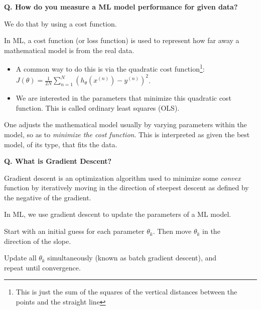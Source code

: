 \begin{frame}[fragile]{\textbf{Q. How do you measure a ML model performance for given data?}}
  \begin{wideitemize}
    \item We do that by using a cost function.
    \item In ML, a cost function (or loss function) is used to represent how far away a mathematical
    model is from the real data.
    \begin{itemize}
      \item A common way to do this is via the quadratic cost function\footnote{This is
      just the sum of the squares of the vertical distances between the points and the straight line}:\vspace{.4em}
      $J(\theta) = \frac{1}{2N}\sum^{N}_{n=1}(h_{\theta}(x^{(n)}) - y^{(n)})^{2}$.\vspace{.4em}
      \item We are interested in the parameters that minimize this quadratic cost function.
      This is called ordinary least squares (OLS).
    \end{itemize}
    \item One adjusts the mathematical model usually by varying parameters within the model, so as
    to \textit{minimize the cost function}. This is interpreted as given the best model, of
    its type, that fits the data.
  \end{wideitemize}
\end{frame}


\begin{frame}[fragile]{\textbf{Q. What is Gradient Descent?}}
  \begin{wideitemize}
    \item Gradient descent is an optimization algorithm used to minimize
    some \textit{convex} function by iteratively moving in the direction of
    steepest descent as defined by the negative of the gradient.
    \item In ML, we use gradient descent to update the parameters of a ML model.
    \begin{wideitemize}
      \item Start with an initial guess for each parameter $\theta_{k}$. Then
      move $\theta_{k}$ in the \\direction of the slope.
      \item Update all $\theta_{k}$ simultaneously (known as batch gradient descent),
      and \\repeat until convergence.
    \end{wideitemize}
  \end{wideitemize}
\end{frame}

